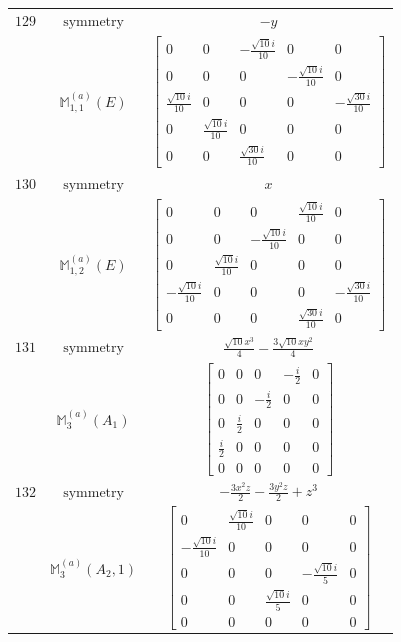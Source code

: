 \documentclass[fleqn,8pt,landscape]{jsarticle}
\begin{document}
\begin{longtable}{ccc}
$ 129 $ & $ \text{symmetry} $ & $ - y $ \\
$  $ & $ \mathbb{M}_{1,1}^{(a)}(E) $ & $ \begin{bmatrix} 0 & 0 & - \frac{\sqrt{10} i}{10} & 0 & 0 \\ 0 & 0 & 0 & - \frac{\sqrt{10} i}{10} & 0 \\ \frac{\sqrt{10} i}{10} & 0 & 0 & 0 & - \frac{\sqrt{30} i}{10} \\ 0 & \frac{\sqrt{10} i}{10} & 0 & 0 & 0 \\ 0 & 0 & \frac{\sqrt{30} i}{10} & 0 & 0 \end{bmatrix} $ \\ \hline
$ 130 $ & $ \text{symmetry} $ & $ x $ \\
$  $ & $ \mathbb{M}_{1,2}^{(a)}(E) $ & $ \begin{bmatrix} 0 & 0 & 0 & \frac{\sqrt{10} i}{10} & 0 \\ 0 & 0 & - \frac{\sqrt{10} i}{10} & 0 & 0 \\ 0 & \frac{\sqrt{10} i}{10} & 0 & 0 & 0 \\ - \frac{\sqrt{10} i}{10} & 0 & 0 & 0 & - \frac{\sqrt{30} i}{10} \\ 0 & 0 & 0 & \frac{\sqrt{30} i}{10} & 0 \end{bmatrix} $ \\ \hline
$ 131 $ & $ \text{symmetry} $ & $ \frac{\sqrt{10} x^{3}}{4} - \frac{3 \sqrt{10} x y^{2}}{4} $ \\
$  $ & $ \mathbb{M}_{3}^{(a)}(A_{1}) $ & $ \begin{bmatrix} 0 & 0 & 0 & - \frac{i}{2} & 0 \\ 0 & 0 & - \frac{i}{2} & 0 & 0 \\ 0 & \frac{i}{2} & 0 & 0 & 0 \\ \frac{i}{2} & 0 & 0 & 0 & 0 \\ 0 & 0 & 0 & 0 & 0 \end{bmatrix} $ \\ \hline
$ 132 $ & $ \text{symmetry} $ & $ - \frac{3 x^{2} z}{2} - \frac{3 y^{2} z}{2} + z^{3} $ \\
$  $ & $ \mathbb{M}_{3}^{(a)}(A_{2},1) $ & $ \begin{bmatrix} 0 & \frac{\sqrt{10} i}{10} & 0 & 0 & 0 \\ - \frac{\sqrt{10} i}{10} & 0 & 0 & 0 & 0 \\ 0 & 0 & 0 & - \frac{\sqrt{10} i}{5} & 0 \\ 0 & 0 & \frac{\sqrt{10} i}{5} & 0 & 0 \\ 0 & 0 & 0 & 0 & 0 \end{bmatrix} $ \\ \hline

\end{longtable}
\end{document}
